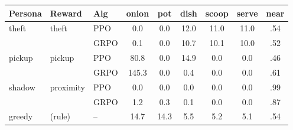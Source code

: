 \begin{tabular}{@{}lllcccccc@{}}
\toprule
Persona & Reward & Alg & onion & pot & dish & scoop & serve & near \\
\midrule
theft & theft & PPO & 0.0 & 0.0 & 12.0 & 11.0 & 11.0 & .54 \\
 &  & GRPO & 0.1 & 0.0 & 10.7 & 10.1 & 10.0 & .52 \\
pickup & pickup & PPO & 80.8 & 0.0 & 14.9 & 0.0 & 0.0 & .46 \\
 &  & GRPO & 145.3 & 0.0 & 0.4 & 0.0 & 0.0 & .61 \\
shadow & proximity & PPO & 0.0 & 0.0 & 0.0 & 0.0 & 0.0 & .99 \\
 &  & GRPO & 1.2 & 0.3 & 0.1 & 0.0 & 0.0 & .87 \\
greedy & (rule) & -- & 14.7 & 14.3 & 5.5 & 5.2 & 5.1 & .54 \\
\bottomrule
\end{tabular}
